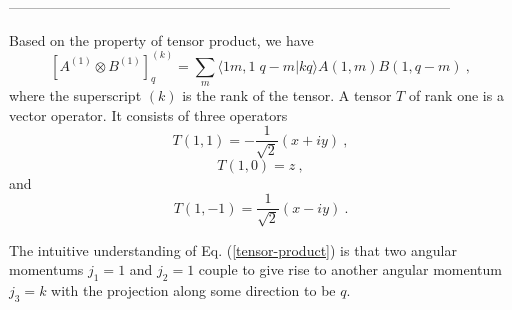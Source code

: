 -----------------------------------------------------------------------------------------------

Based on the property of tensor product, we have
\begin{equation}
\left[ A^{(1)} \otimes B^{(1)} \right]_{q}^{(k)} =\sum_{m} \langle 1m, 1\;q-m | kq \rangle A(1,m)B(1, q-m) \ , \label{tensor-product}
\end{equation}
where the superscript $(k)$ is the rank of the tensor. A tensor $T$ of rank one is a vector operator. It consists of three operators 
\begin{equation}
T(1,1) = - \frac{1}{\sqrt{2}} (x + i y) \ , \label{t11}
\end{equation}
\begin{equation}
T(1,0) = z \ , \label{t10}
\end{equation}
and 
\begin{equation}
T(1,-1) =  \frac{1}{\sqrt{2}} (x - i y) \ .  \label{t1-1}
\end{equation}

The intuitive understanding of Eq. (\ref{tensor-product}) is that two angular momentums $j_{1} =1$ and $j_{2}=1$ couple to give rise to another angular momentum $j_{3}=k$ with the projection along some direction to be $q$. 

